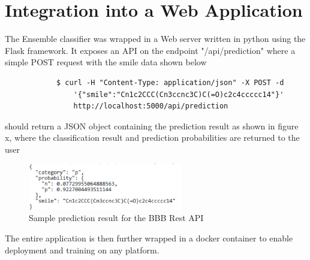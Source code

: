 \documentclass[a4paper,12pt]{report}
\begin{document}
	\section{Integration into a Web Application}
		The Ensemble classifier was wrapped in a Web server written in python using the Flask framework. It exposes an API on the endpoint "/api/prediction" where a simple POST request with the smile data shown below
		\begin{verbatim}
			$ curl -H "Content-Type: application/json" -X POST -d 
			    '{"smile":"Cn1c2CCC(Cn3ccnc3C)C(=O)c2c4ccccc14"}'   
			    http://localhost:5000/api/prediction
		\end{verbatim}
		should return a JSON object containing the prediction result as shown in figure x, where the classification result and prediction probabilities are returned to the user
			\begin{figure}[H]
				\centering
				\includegraphics[width=0.6\textwidth,scale=1]{images/sample_prediction_result}
				\caption{Sample prediction result for the BBB Rest API}
				\label{fig:bbb_sample_prediction_result}
			\end{figure}
		The entire application is then further wrapped in a docker container to enable deployment and training on any platform.
\end{document}
